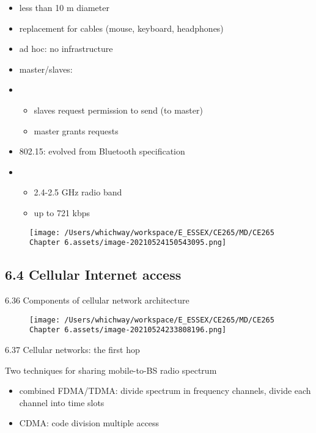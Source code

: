 \documentclass[
]{article}
\begin{document}
\begin{itemize}
\item
  less than 10 m diameter
\item
  replacement for cables (mouse, keyboard, headphones)
\item
  ad hoc: no infrastructure
\item
  master/slaves:
\item
  \begin{itemize}
  \item
    slaves request permission to send (to master)
  \item
    master grants requests
  \end{itemize}
\item
  802.15: evolved from Bluetooth specification
\item
  \begin{itemize}
  \item
    2.4-2.5 GHz radio band
  \item
    up to 721 kbps
  \end{itemize}
\end{itemize}

\begin{figure}
\centering
\texttt{[image: /Users/whichway/workspace/E\_ESSEX/CE265/MD/CE265 Chapter 6.assets/image-20210524150543095.png]}
\caption{}
\end{figure}

\hypertarget{64-cellular-internet-access}{%
\subsection{6.4 Cellular Internet
access}\label{64-cellular-internet-access}}

6.36 Components of cellular network architecture

\begin{figure}
\centering
\texttt{[image: /Users/whichway/workspace/E\_ESSEX/CE265/MD/CE265 Chapter 6.assets/image-20210524233808196.png]}
\caption{}
\end{figure}

6.37 Cellular networks: the first hop

Two techniques for sharing mobile-to-BS radio spectrum

\begin{itemize}
\item
  combined FDMA/TDMA: divide spectrum in frequency channels, divide each
  channel into time slots
\item
  CDMA: code division multiple access
\end{itemize}
\end{document}
